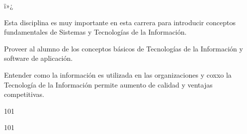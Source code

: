 ï»¿\begin{syllabus}


\begin{justification}
Esta disciplina es muy importante en esta carrera para introducir conceptos fundamentales de Sistemas y Tecnologías de la Información.
\end{justification}

\begin{goals}
\item Proveer al alumno de los conceptos básicos de Tecnologías de la Información y software de aplicación.
\item Entender como la información es utilizada en las organizaciones y coxxo la Tecnología de la Información permite aumento de calidad y ventajas competitivas.
\end{goals}

\begin{outcomes}
\end{outcomes}

\begin{unit}{\LUFIVEDef}{\LUFIVEBib}{10}{1}
   \begin{topics}
      \item \OMCTWOTopicTWOxTWOxONEOH
      \item \TDSONETopicTHREExONExONE
      \item \TDSONETopicTHREExONExTWO
      \item \TDSONETopicTHREExONExTHREE
      \item \TDSONETopicTHREExONExFOUR
      \item \TDSONETopicTHREExONExFIVE
   \end{topics}
	\LUFIVEGoal
\end{unit}

\begin{unit}{\LUSIXDef}{\LUSIXBib}{10}{1}
   \begin{topics}
      \item \OMCTHREETopicTWOxTHREExONE
      \item \OMCTHREETopicTWOxTHREExTWO
      \item \OMCTHREETopicTWOxTHREExTHREE
   \end{topics}
	\LUSIXGoal
\end{unit}


\end{syllabus}

